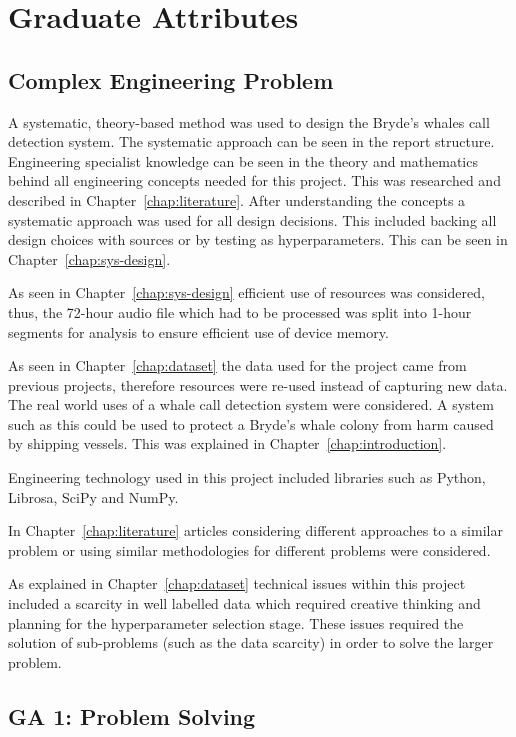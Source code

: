 \chapter{Graduate Attributes}
\makeatletter{}\makeatother\label{appen:grad_att}

\section{Complex Engineering Problem}\label{sec:ecsa_1}
A systematic, theory-based method was used to design the Bryde's whales 
call detection system. The systematic approach can be seen in the report 
structure. Engineering specialist knowledge can be seen in the 
theory and mathematics behind all engineering concepts needed 
for this project. This was researched and described in Chapter~\ref{chap:literature}. 
After understanding the concepts a systematic approach was used for all 
design decisions. This included backing all design choices with sources or 
by testing as hyperparameters. This can be seen in Chapter~\ref{chap:sys-design}.

As seen in Chapter~\ref{chap:sys-design} efficient use of resources 
was considered, thus, the 72-hour audio 
file which had to be processed was split into 1-hour segments for analysis 
to ensure efficient use of device memory. 

As seen in Chapter~\ref{chap:dataset} the data used for the project 
came from previous projects, therefore resources were re-used instead of 
capturing new data. 
The real world uses of a whale call detection system 
were considered. A system such as this could be used to protect a Bryde's 
whale colony from harm caused by shipping vessels. This was explained in 
Chapter~\ref{chap:introduction}.

Engineering technology used in this project included libraries such as Python, 
Librosa, SciPy and NumPy.

In Chapter~\ref{chap:literature} articles considering different approaches 
to a similar problem or using similar methodologies for different problems 
were considered.

As explained in Chapter~\ref{chap:dataset} technical issues within 
this project included a scarcity in well labelled 
data which required creative thinking and planning for the hyperparameter 
selection stage. These issues required the solution of sub-problems (such 
as the data scarcity) in order to solve the larger problem.


\section{GA 1: Problem Solving}\label{sec:ga_1}

